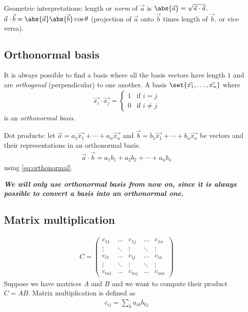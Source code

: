 \documentclass[12pt, oneside, letterpaper, fleqn]{article}
\begin{document}
Geometric interpretations: length or \emph{norm} of $\vec{a}$ is
$\abs{\vec{a}} = \sqrt{\vec{a} \cdot \vec{a}}$. $\vec{a} \cdot \vec{b} =
\abs{\vec{a}}\abs{\vec{b}} \cos\theta$ (projection of $\vec{a}$ onto
$\vec{b}$ times length of $\vec{b}$, or vice versa).

\subsection{Orthonormal basis}
It is always possible to find a basis where all the basis vectors have
length $1$ and are \emph{orthogonal} (perpendicular) to one another.
A basis $\set{\vec{x_1}, \dotsc, \vec{x_n}}$ where
\begin{align}\label{eq:orthonormal}
\vec{x_i} \cdot \vec{x_j} = \begin{cases}
1 & \text{if } i = j\\
0 & \text{if } i \neq j
\end{cases}
\end{align}
is an \emph{orthonormal basis}.

Dot products: let $\vec{a} = a_1\vec{x_1} +\dotsb+ a_n\vec{x_n}$ and
$\vec{b} = b_1\vec{x_1} +\dotsb+ b_n\vec{x_n}$ be vectors and their
representations in an orthonormal basis.
\begin{align}
\vec{a}\cdot\vec{b} = a_1b_1 + a_2b_2 + \dotsb + a_nb_n
\end{align}
using \eqref{eq:orthonormal}.

\emph{\textbf{We will only use orthonormal
basis from now on, since it is always possible to convert a basis into
an orthonormal one.}}

\subsection{Matrix multiplication}
\begin{align*}
C = \begin{pmatrix}
c_{11} & \hdots & c_{1j} & \hdots & c_{1n}\\
\vdots & \ddots & \vdots & \ddots & \vdots\\
c_{i1} & \hdots & c_{ij} & \hdots & c_{in}\\
\vdots & \ddots & \vdots & \ddots & \vdots\\
c_{m1} & \hdots & c_{mj} & \hdots & c_{mn}
\end{pmatrix}
\end{align*}
Suppose we have matrices $A$ and $B$ and we want to compute their
product $C = AB$. Matrix multiplication is defined as
\begin{align}
c_{ij} = \sum_k a_{ik}b_{kj}
\end{align}
\end{document}
